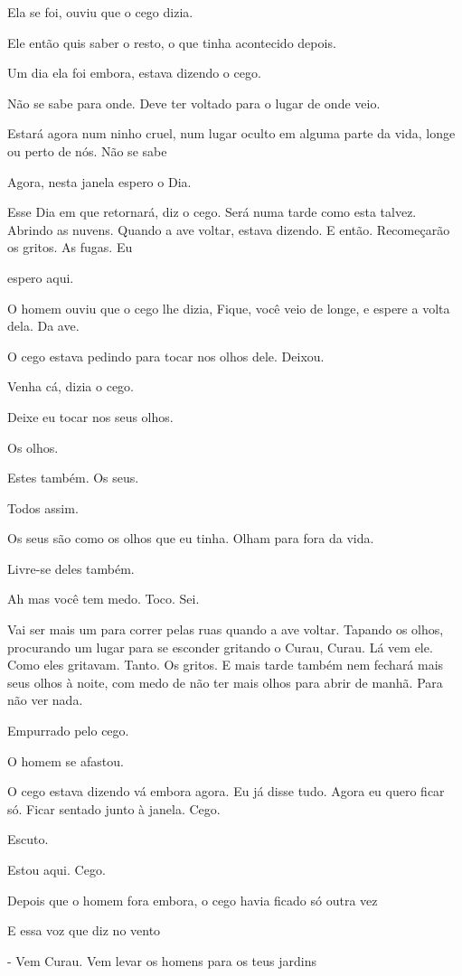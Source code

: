 Ela se foi, ouviu que o cego dizia.

Ele então quis saber o resto, o que tinha acontecido depois.

Um dia ela foi embora, estava dizendo o cego.

Não se sabe para onde. Deve ter voltado para o lugar de onde veio.

Estará agora num ninho cruel, num lugar oculto em alguma parte da vida,
longe ou perto de nós. Não se sabe

Agora, nesta janela espero o Dia.

Esse Dia em que retornará, diz o cego. Será numa tarde como esta talvez.
Abrindo as nuvens. Quando a ave voltar, estava dizendo. E então.
Recomeçarão os gritos. As fugas. Eu

espero aqui.

O homem ouviu que o cego lhe dizia, Fique, você veio de longe, e espere
a volta dela. Da ave.

O cego estava pedindo para tocar nos olhos dele. Deixou.

Venha cá, dizia o cego.

Deixe eu tocar nos seus olhos.

Os olhos.

Estes também. Os seus.

Todos assim.

Os seus são como os olhos que eu tinha. Olham para fora da vida.

Livre-se deles também.

Ah mas você tem medo. Toco. Sei.

Vai ser mais um para correr pelas ruas quando a ave voltar. Tapando os
olhos, procurando um lugar para se esconder gritando o Curau, Curau. Lá
vem ele. Como eles gritavam. Tanto. Os gritos. E mais tarde também nem
fechará mais seus olhos à noite, com medo de não ter mais olhos para
abrir de manhã. Para não ver nada.

Empurrado pelo cego.

O homem se afastou.

O cego estava dizendo vá embora agora. Eu já disse tudo. Agora eu quero
ficar só. Ficar sentado junto à janela. Cego.

Escuto.

Estou aqui. Cego.

Depois que o homem fora embora, o cego havia ficado só outra vez

E essa voz que diz no vento

- Vem Curau. Vem levar os homens para os teus jardins

